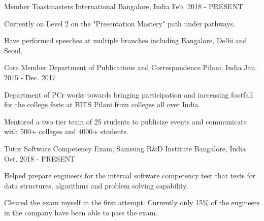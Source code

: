 

\begin{cventries}

  \cventry
    {Member} %
    {Toastmasters International} %
    {Bangalore, India} %
    {Feb. 2018 - PRESENT} %
    {
      \begin{cvitems} %
      \item {Currently on Level 2 on the "Presentation Mastery" path under pathways.}
      \item {Have performed speeches at multiple branches including Bangalore, Delhi and Seoul.}
      \end{cvitems}
    }

  \cventry
    {Core Member} %
    {Department of Publications and Correspondence} %
    {Pilani, India} %
    {Jan. 2015 - Dec. 2017} %
    {
      \begin{cvitems} %
      \item {Department of PCr works towards bringing participation and increasing footfall for the college fests at BITS Pilani from colleges all over India.}
      \item {Mentored a two tier team of 25 students to publicize events and communicate with 500+ colleges and 4000+ students.}
      \end{cvitems}
    }

  \cventry
    {Tutor} %
    {Software Competency Exam, Samsung R\&D Institute} %
    {Bangalore, India} %
    {Oct. 2018 - PRESENT} %
    {
      \begin{cvitems} %
      \item {Helped prepare engineers for the internal software competency test that tests for data structures, algorithms and problem solving capability.}
      \item {Cleared the exam myself in the first attempt. Currently only 15\% of the engineers in the company have been able to pass the exam.}
      \end{cvitems}
    }

\end{cventries}
